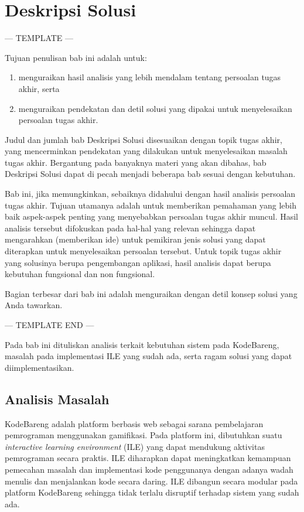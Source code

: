 \chapter{Deskripsi Solusi}
--- TEMPLATE ---

Tujuan penulisan bab ini adalah untuk:
\begin{enumerate}
  \item menguraikan hasil analisis yang lebih mendalam tentang persoalan tugas akhir, serta
  \item menguraikan pendekatan dan detil solusi yang dipakai untuk menyelesaikan persoalan tugas akhir.
\end{enumerate}

Judul dan jumlah bab Deskripsi Solusi disesuaikan dengan topik tugas akhir, yang mencerminkan pendekatan yang dilakukan untuk menyelesaikan masalah tugas akhir. Bergantung pada banyaknya materi yang akan dibahas, bab Deskripsi Solusi dapat di pecah menjadi beberapa bab sesuai dengan kebutuhan.

Bab ini, jika memungkinkan, sebaiknya didahului dengan hasil analisis persoalan tugas akhir. Tujuan utamanya adalah untuk memberikan pemahaman yang lebih baik aspek-aspek penting yang menyebabkan persoalan tugas akhir muncul. Hasil analisis tersebut difokuskan pada hal-hal yang relevan sehingga dapat mengarahkan (memberikan ide) untuk pemikiran jenis solusi yang dapat diterapkan untuk menyelesaikan persoalan tersebut. Untuk topik tugas akhir yang solusinya berupa pengembangan aplikasi, hasil analisis dapat berupa kebutuhan fungsional dan non fungsional.

Bagian terbesar dari bab ini adalah menguraikan dengan detil konsep solusi yang Anda tawarkan.

--- TEMPLATE END ---

Pada bab ini dituliskan analisis terkait kebutuhan sistem pada KodeBareng, masalah pada implementasi ILE yang sudah ada, serta ragam solusi yang dapat diimplementasikan.

\section{Analisis Masalah}
KodeBareng adalah platform berbasis web sebagai sarana pembelajaran pemrograman menggunakan gamifikasi. Pada platform ini, dibutuhkan suatu \textit{interactive learning environment} (ILE) yang dapat mendukung aktivitas pemrograman secara praktis. ILE diharapkan dapat meningkatkan kemampuan pemecahan masalah dan implementasi kode penggunanya dengan adanya wadah menulis dan menjalankan kode secara daring. ILE dibangun secara modular pada platform KodeBareng sehingga tidak terlalu disruptif terhadap sistem yang sudah ada.

